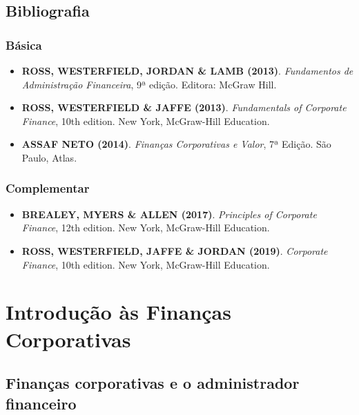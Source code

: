 \documentclass[
]{book}
\providecommand{\tightlist}{%
  \setlength{\itemsep}{0pt}\setlength{\parskip}{0pt}}
\theoremstyle{definition}
\theoremstyle{definition}
\theoremstyle{definition}
\theoremstyle{definition}
\theoremstyle{remark}
\begin{document}
\hypertarget{bibliografia}{%
\section{Bibliografia}\label{bibliografia}}

\hypertarget{buxe1sica}{%
\subsection{Básica}\label{buxe1sica}}

\begin{itemize}
\tightlist
\item
  \textbf{ROSS, WESTERFIELD, JORDAN \& LAMB (2013)}. \emph{Fundamentos de Administração Financeira}, 9ª edição. Editora: McGraw Hill.\\
\item
  \textbf{ROSS, WESTERFIELD \& JAFFE (2013)}. \emph{Fundamentals of Corporate Finance}, 10th edition. New York, McGraw-Hill Education.\\
\item
  \textbf{ASSAF NETO (2014)}. \emph{Finanças Corporativas e Valor}, 7ª Edição. São Paulo, Atlas.
\end{itemize}

\hypertarget{complementar}{%
\subsection{Complementar}\label{complementar}}

\begin{itemize}
\tightlist
\item
  \textbf{BREALEY, MYERS \& ALLEN (2017)}. \emph{Principles of Corporate Finance}, 12th edition. New York, McGraw-Hill Education.\\
\item
  \textbf{ROSS, WESTERFIELD, JAFFE \& JORDAN (2019)}. \emph{Corporate Finance}, 10th edition. New York, McGraw-Hill Education.
\end{itemize}

\hypertarget{introduuxe7uxe3o-uxe0s-finanuxe7as-corporativas}{%
\chapter{Introdução às Finanças Corporativas}\label{introduuxe7uxe3o-uxe0s-finanuxe7as-corporativas}}

\hypertarget{finanuxe7as-corporativas-e-o-administrador-financeiro}{%
\section{Finanças corporativas e o administrador financeiro}\label{finanuxe7as-corporativas-e-o-administrador-financeiro}}
\end{document}
